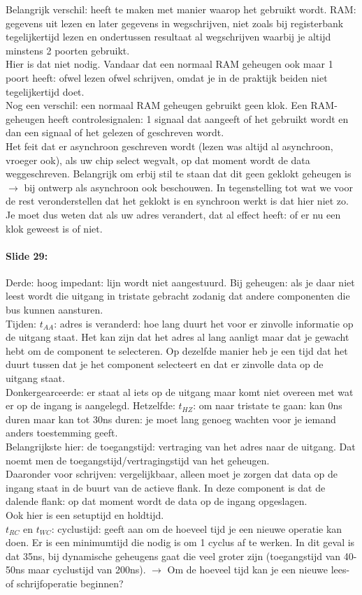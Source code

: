 \documentclass[10pt,a4paper]{book}
\begin{document}
Belangrijk verschil: heeft te maken met manier waarop het gebruikt wordt. RAM: gegevens uit lezen en later gegevens in wegschrijven, niet zoals bij registerbank tegelijkertijd lezen en ondertussen resultaat al wegschrijven waarbij je altijd minstens 2 poorten gebruikt.\\
Hier is dat niet nodig. Vandaar dat een normaal RAM geheugen ook maar 1 poort heeft: ofwel lezen ofwel schrijven, omdat je in de praktijk beiden niet tegelijkertijd doet.\\
Nog een verschil: een normaal RAM geheugen gebruikt geen klok. Een RAM-geheugen heeft controlesignalen: 1 signaal dat aangeeft of het gebruikt wordt en dan een signaal of het gelezen of geschreven wordt.\\
Het feit dat er asynchroon geschreven wordt (lezen was altijd al asynchroon, vroeger ook), als uw chip select wegvalt, op dat moment wordt de data weggeschreven. Belangrijk om erbij stil te staan dat dit geen geklokt geheugen is $\rightarrow$ bij ontwerp als asynchroon ook beschouwen. In tegenstelling tot wat we voor de rest veronderstellen dat het geklokt is en synchroon werkt is dat hier niet zo. Je moet dus weten dat als uw adres verandert, dat al effect heeft: of er nu een klok geweest is of niet. 

\paragraph{Slide 29:} Derde: hoog impedant: lijn wordt niet aangestuurd. Bij geheugen: als je daar niet leest wordt die uitgang in tristate gebracht zodanig dat andere componenten die bus kunnen aansturen.\\
Tijden: $t_{AA}$: adres is veranderd: hoe lang duurt het voor er zinvolle informatie op de uitgang staat. Het kan zijn dat het adres al lang aanligt maar dat je gewacht hebt om de component te selecteren. Op dezelfde manier heb je een tijd dat het duurt tussen dat je het component selecteert en dat er zinvolle data op de uitgang staat.\\
Donkergearceerde: er staat al iets op de uitgang maar komt niet overeen met wat er op de ingang is aangelegd. Hetzelfde: $t_{HZ}$: om naar tristate te gaan: kan 0ns duren maar kan tot 30ns duren: je moet lang genoeg wachten voor je iemand anders toestemming geeft.\\
Belangrijkste hier: de toegangstijd: vertraging van het adres naar de uitgang. Dat noemt men de toegangstijd/vertragingstijd van het geheugen.\\
Daaronder voor schrijven: vergelijkbaar, alleen moet je zorgen dat data op de ingang staat in de buurt van de actieve flank. In deze component is dat de dalende flank: op dat moment wordt de data op de ingang opgeslagen.\\
Ook hier is een setuptijd en holdtijd.\\
$t_{RC}$ en $t_{WC}$: cyclustijd: geeft aan om de hoeveel tijd je een nieuwe operatie kan doen. Er is een minimumtijd die nodig is om 1 cyclus af te werken. In dit geval is dat 35ns, bij dynamische geheugens gaat die veel groter zijn (toegangstijd van 40-50ns maar cyclustijd van 200ns). $\rightarrow$ Om de hoeveel tijd kan je een nieuwe lees- of schrijfoperatie beginnen?
\end{document}
